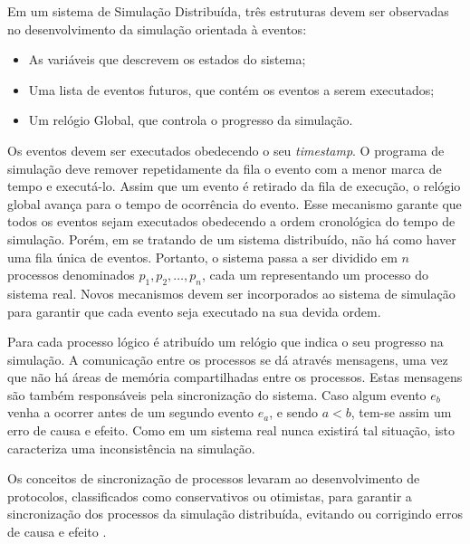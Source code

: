 Em um sistema de Simulação Distribuída, três estruturas devem ser observadas no desenvolvimento da simulação orientada à eventos:

\begin{itemize}
    \item As variáveis que descrevem os estados do sistema;
    \item Uma lista de eventos futuros, que contém os eventos a serem executados;
    \item Um relógio Global, que controla o progresso da simulação.
\end{itemize}

Os eventos devem ser executados obedecendo o seu \textit{timestamp}. O programa de simulação deve remover repetidamente da fila o evento com a menor marca de tempo e executá-lo. Assim que um evento é retirado da fila de execução, o relógio global avança para o tempo de ocorrência do evento. Esse mecanismo garante que todos os eventos sejam executados obedecendo a ordem cronológica do tempo de simulação. Porém, em se tratando de um sistema distribuído, não há como haver uma fila única de eventos. Portanto, o sistema passa a ser dividido em $n$ processos denominados $p_{1}, p_{2},\ldots, p_{n}$, cada um representando um processo do sistema real. Novos mecanismos devem ser incorporados ao sistema de simulação para garantir que cada evento seja executado na sua devida ordem.

Para cada processo lógico é atribuído um relógio que indica o seu progresso na simulação. A comunicação entre os processos se dá através mensagens, uma vez que não há áreas de memória compartilhadas entre os processos. Estas mensagens são também responsáveis pela sincronização do sistema. Caso algum evento $e_b$ venha a ocorrer antes de um segundo evento $e_a$, e sendo $a < b$, tem-se assim um erro de causa e efeito. Como em um sistema real nunca existirá tal situação, isto caracteriza uma inconsistência na simulação.

Os conceitos de sincronização de processos levaram ao desenvolvimento de protocolos, classificados como conservativos ou otimistas, para garantir a sincronização dos processos da simulação distribuída, evitando ou corrigindo erros de causa e efeito \cite{FUJIMOTO}.
